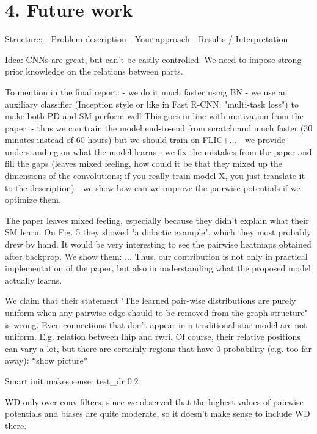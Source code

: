 \documentclass[a4paper,11pt]{article}
\begin{document}
	\section{4. Future work}


    Structure:
    - Problem description
    - Your approach
    - Results / Interpretation

    Idea: CNNs are great, but can't be easily controlled. We need to impose strong prior knowledge on the
    relations between parts.


    To mention in the final report:
    - we do it much faster using BN
    - we use an auxiliary classifier (Inception style or like in Fast R-CNN: "multi-task loss") to make both PD and SM perform well
    This goes in line with motivation from the paper.
    - thus we can train the model end-to-end from scratch and much faster (30 minutes instead of 60 hours)
    but we should train on FLIC+...
    - we provide understanding on what the model learns
    - we fix the mistakes from the paper and fill the gaps (leaves mixed feeling, how could it be that they mixed up
    the dimensions of the convolutions; if you really train model X, you just translate it to the description)
    - we show how can we improve the pairwise potentials if we optimize them.

    The paper leaves mixed feeling, especially because they didn't explain what their SM learn.
    On Fig. 5 they showed "a didactic example", which they most probably drew by hand.
    It would be very interesting to see the pairwise heatmaps obtained after backprop. We show them: ...
    Thus, our contribution is not only in practical implementation of the paper, but also in understanding what the proposed
    model actually learns.

    We claim that their statement "The learned pair-wise distributions are purely uniform when any pairwise edge should to
    be removed from the graph structure" is wrong. Even connections that don't appear in a traditional star model are not
    uniform. E.g. relation between lhip and rwri. Of course, their relative positions can vary a lot, but there are certainly
    regions that have 0 probability (e.g. too far away): *show picture*

    Smart init makes sense: test_dr 0.2%


    WD only over conv filters, since we observed that the highest values of pairwise potentials and biases are
    quite moderate, so it doesn't make sense to include WD there.
\end{document}
